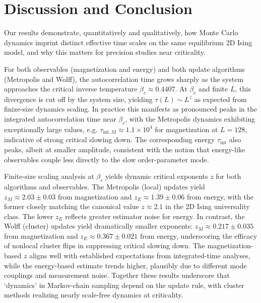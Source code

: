\section{Discussion and Conclusion}


Our results demonstrate, quantitatively and qualitatively, how Monte Carlo dynamics imprint distinct effective time scales on the same equilibrium 2D Ising model, and why this matters for precision studies near criticality.

For both observables (magnetization and energy) and both update algorithms (Metropolis and Wolff), the autocorrelation time grows sharply as the system approaches the critical inverse temperature $\beta_c \approx 0.4407$. At $\beta_c$ and finite $L$, this divergence is cut off by the system size, yielding $\tau(L) \sim L^z$ as expected from finize-size dynamics scaling. In practice this manifests as pronounced peaks in the integrated autocorrelation time near $\beta_c$, with the Metropolis dynamics exhibiting exceptionally large values, e.g. $\tau_{\text{int},M} \approx 1.1 \times 10^4$ for magnetization at $L=128$, indicative of strong critical slowing down. The corresponding energy $\tau_{\text{int}}$ also peaks, albeit at smaller amplitude, consistent with the notion that energy-like observables couple less directly to the slow order-parameter mode.

Finite-size scaling analysis at $\beta_c$ yields dynamic critical exponents $z$ for both algorithms and observables.
The Metropolis (local) updates yield $z_M \approx 2.03 \pm 0.03$ from magnetization and $z_E \approx 1.39 \pm 0.06$ from energy, with the former closely matching the canonical value $z \approx 2.1$ in the 2D Ising universality class. The lower $z_E$ reflects greater estimator noise for energy.
In contrast, the Wolff (cluster) updates yield dramatically smaller exponents: $z_M \approx 0.217 \pm 0.035$ from magnetization and $z_E \approx 0.367 \pm 0.021$ from energy, underscoring the efficacy of nonlocal cluster flips in suppressing critical slowing down.
The magnetization-based $z$ aligns well with established expectations from integrated-time analyses, while the energy-based estimate trends higher, plausibly due to different mode couplings and measurement noise.
Together these results underscore that `dynamics' in Markov-chain sampling depend on the update rule, with cluster methods realizing nearly scale-free dynamics at criticality.

